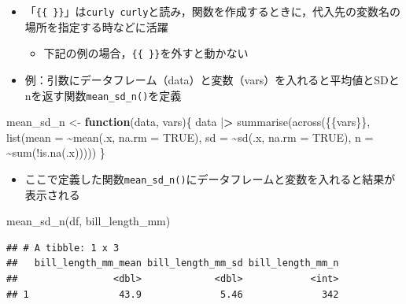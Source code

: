 \documentclass[
  xelatex,ja=standard, b5paper]{bxjsbook}
\newenvironment{Shaded}{\begin{snugshade}}{\end{snugshade}}
\newcommand{\AttributeTok}[1]{\textcolor[rgb]{0.77,0.63,0.00}{#1}}
\newcommand{\ConstantTok}[1]{\textcolor[rgb]{0.00,0.00,0.00}{#1}}
\newcommand{\ControlFlowTok}[1]{\textcolor[rgb]{0.13,0.29,0.53}{\textbf{#1}}}
\newcommand{\ErrorTok}[1]{\textcolor[rgb]{0.64,0.00,0.00}{\textbf{#1}}}
\newcommand{\FunctionTok}[1]{\textcolor[rgb]{0.00,0.00,0.00}{#1}}
\newcommand{\NormalTok}[1]{#1}
\newcommand{\OtherTok}[1]{\textcolor[rgb]{0.56,0.35,0.01}{#1}}
\newcommand{\SpecialCharTok}[1]{\textcolor[rgb]{0.00,0.00,0.00}{#1}}
\providecommand{\tightlist}{%
  \setlength{\itemsep}{0pt}\setlength{\parskip}{0pt}}
\begin{document}
\begin{itemize}
\tightlist
\item
  「\texttt{\{\{\ \}\}}」は\texttt{curly\ curly}と読み，関数を作成するときに，代入先の変数名の場所を指定する時などに活躍

  \begin{itemize}
  \tightlist
  \item
    下記の例の場合，\texttt{\{\{\ \}\}}を外すと動かない
  \end{itemize}
\item
  例：引数にデータフレーム（data）と変数（vars）を入れると平均値とSDとnを返す関数\texttt{mean\_sd\_n()}を定義
\end{itemize}

\begin{Shaded}
\begin{Highlighting}[]
\NormalTok{mean\_sd\_n }\OtherTok{\textless{}{-}} \ControlFlowTok{function}\NormalTok{(data, vars)\{}
\NormalTok{data }\SpecialCharTok{|}\ErrorTok{\textgreater{}} 
  \FunctionTok{summarise}\NormalTok{(}\FunctionTok{across}\NormalTok{(\{\{vars\}\},}
                   \FunctionTok{list}\NormalTok{(}\AttributeTok{mean =} \SpecialCharTok{\textasciitilde{}}\FunctionTok{mean}\NormalTok{(.x, }\AttributeTok{na.rm =} \ConstantTok{TRUE}\NormalTok{),}
                        \AttributeTok{sd =} \SpecialCharTok{\textasciitilde{}}\FunctionTok{sd}\NormalTok{(.x, }\AttributeTok{na.rm =} \ConstantTok{TRUE}\NormalTok{),}
                        \AttributeTok{n =} \SpecialCharTok{\textasciitilde{}}\FunctionTok{sum}\NormalTok{(}\SpecialCharTok{!}\FunctionTok{is.na}\NormalTok{(.x)))))}
\NormalTok{\}}
\end{Highlighting}
\end{Shaded}

\begin{itemize}
\tightlist
\item
  ここで定義した関数\texttt{mean\_sd\_n()}にデータフレームと変数を入れると結果が表示される
\end{itemize}

\begin{Shaded}
\begin{Highlighting}[]
\FunctionTok{mean\_sd\_n}\NormalTok{(df, bill\_length\_mm)}
\end{Highlighting}
\end{Shaded}

\begin{verbatim}
## # A tibble: 1 x 3
##   bill_length_mm_mean bill_length_mm_sd bill_length_mm_n
##                 <dbl>             <dbl>            <int>
## 1                43.9              5.46              342
\end{verbatim}
\end{document}
